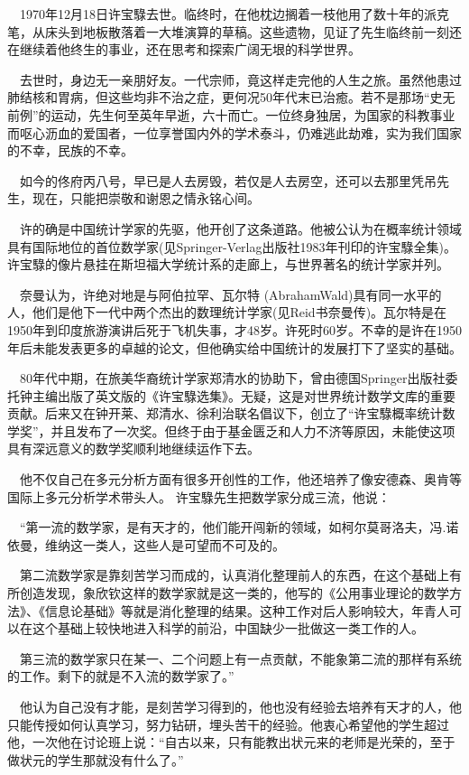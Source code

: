 \documentclass[a4paper,AutoFakeBold,oneside,12pt]{article}
\begin{document}
	$\quad$1970年12月18日许宝騄去世。临终时，在他枕边搁着一枝他用了数十年的派克笔，从床头到地板散落着一大堆演算的草稿。这些遗物，见证了先生临终前一刻还在继续着他终生的事业，还在思考和探索广阔无垠的科学世界。

$\quad$去世时，身边无一亲朋好友。一代宗师，竟这样走完他的人生之旅。虽然他患过肺结核和胃病，但这些均非不治之症，更何况50年代末已治癒。若不是那场“史无前例”的运动，先生何至英年早逝，六十而亡。一位终身独居，为国家的科教事业而呕心沥血的爱国者，一位享誉国内外的学术泰斗，仍难逃此劫难，实为我们国家的不幸，民族的不幸。

$\quad$如今的佟府丙八号，早已是人去房毁，若仅是人去房空，还可以去那里凭吊先生，现在，只能把崇敬和谢恩之情永铭心间。

	$\quad$许的确是中国统计学家的先驱，他开创了这条道路。他被公认为在概率统计领域具有国际地位的首位数学家(见Springer-Verlag出版社1983年刊印的许宝騄全集)。许宝騄的像片悬挂在斯坦福大学统计系的走廊上，与世界著名的统计学家并列。

$\quad$奈曼认为，许绝对地是与阿伯拉罕、瓦尔特 (AbrahamWald)具有同一水平的人，他们是他下一代中两个杰出的数理统计学家(见Reid书奈曼传)。瓦尔特是在1950年到印度旅游演讲后死于飞机失事，才48岁。许死时60岁。不幸的是许在1950年后未能发表更多的卓越的论文，但他确实给中国统计的发展打下了坚实的基础。

$\quad$80年代中期，在旅美华裔统计学家郑清水的协助下，曾由德国Springer出版社委托钟主编出版了英文版的《许宝騄选集》。无疑，这是对世界统计数学文库的重要贡献。后来又在钟开莱、郑清水、徐利治联名倡议下，创立了“许宝騄概率统计数学奖”，并且发布了一次奖。但终于由于基金匮乏和人力不济等原因，未能使这项具有深远意义的数学奖顺利地继续运作下去。 

	$\quad$他不仅自己在多元分析方面有很多开创性的工作，他还培养了像安德森、奥肯等国际上多元分析学术带头人。
许宝騄先生把数学家分成三流，他说：

$\quad$“第一流的数学家，是有天才的，他们能开闯新的领域，如柯尔莫哥洛夫，冯.诺依曼，维纳这一类人，这些人是可望而不可及的。

$\quad$第二流数学家是靠刻苦学习而成的，认真消化整理前人的东西，在这个基础上有所创造发现，象欣钦这样的数学家就是这一类的，他写的《公用事业理论的数学方法》、《信息论基础》等就是消化整理的结果。这种工作对后人影响较大，年青人可以在这个基础上较快地进入科学的前沿，中国缺少一批做这一类工作的人。

$\quad$第三流的数学家只在某一、二个问题上有一点贡献，不能象第二流的那样有系统的工作。剩下的就是不入流的数学家了。”

	$\quad$他认为自己没有才能，是刻苦学习得到的，他也没有经验去培养有天才的人，他只能传授如何认真学习，努力钻研，埋头苦干的经验。他衷心希望他的学生超过他，一次他在讨论班上说：“自古以来，只有能教出状元来的老师是光荣的，至于做状元的学生那就没有什么了。”
\end{document}
